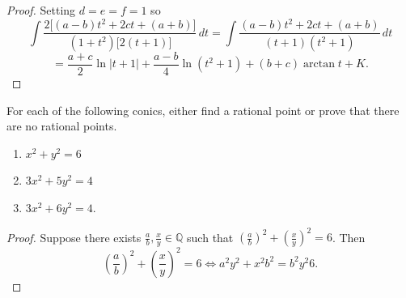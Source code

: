 \begin{proof}
    Setting $d = e = f = 1$ so
    \[
        \int \frac{2\bigl[(a-b)t^2 + 2ct + (a+b)\bigr]}{(1+t^2)\bigl[2(t+1)\bigr]}\,dt
        = \int \frac{(a-b)t^2 + 2ct + (a+b)}{(t+1)(t^2+1)}\,dt
    \]
    \[
        = \frac{a+c}{2}\ln|t+1| + \frac{a-b}{4}\ln(t^2+1) + (b+c)\arctan t + K.
    \]
\end{proof}

\begin{tcolorbox}[title=Problem 7, breakable]
    For each of the following conics, either find a rational point or prove that there  
        are no rational points.
    \begin{enumerate}
        \item $x^2 + y^2 = 6$
        \item $3x^2 + 5y^2 = 4$
        \item $3x^2 + 6y^2 = 4$.
    \end{enumerate}
\end{tcolorbox}

\begin{proof}
    Suppose there exists $\frac{a}{b}, \frac{x}{y} \in \mathbb{Q}$
    such that $\left(\frac{a}{b}\right)^2 + \left(\frac{x}{y}\right)^2 = 6$.
    Then 
    \[\left(\frac{a}{b}\right)^2 + \left(\frac{x}{y}\right)^2 = 6
        \iff a^2 y^2 + x^2 b^2 = b^2 y^2 6.\]
\end{proof}